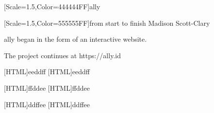 \documentclass[11pt,onesided]{memoir}
\begin{document}
  \frontmatter

  

  \pagestyle{plain}

  \doublespacing

  \null
  \vfill
  \begin{flushright}
    {[Scale=1.5,Color=444444FF]\Huge ally}

    \vfill
    
    {[Scale=1.5,Color=555555FF]\normalsize from start to finish}
    \vfill
    {\Huge Madison Scott-Clary}
  \end{flushright}
  \thispagestyle{empty}

  \newpage

  

  \newpage
  \null
  \thispagestyle{empty}
  \cleardoublepage

  \onehalfspacing

  \null
  \vfill
  \begin{center}
    {\allyFont ally} began in the form of an interactive website.

    The project continues at {\allyFont https://ally.id}
  \end{center}
  \vfill

  \mainmatter

  \pagestyle{ourbook}
  \setlength\columnsep{20pt}
  [HTML]{eeddff}
  [HTML]{eeddff}
  
  [HTML]{ffddee}
  [HTML]{ffddee}
  
  [HTML]{ddffee}
  [HTML]{ddffee}
  
  


  \backmatter
  \pagestyle{empty}
\end{document}
